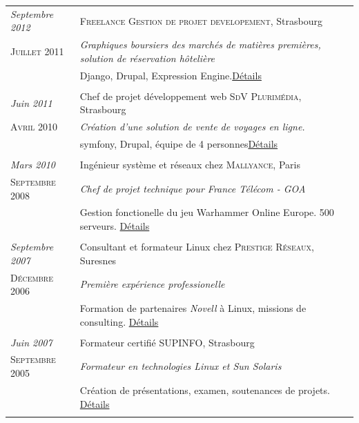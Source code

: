 \documentclass[a4paper,10pt]{article}
\begin{document}
\begin{tabular}{p{}|p{}}
	\emph{Septembre 2012} & \textsc{Freelance Gestion de projet developement}, Strasbourg \\\textsc{Juillet 2011}&\emph{Graphiques boursiers des marchés de matières premières, solution de réservation hôtelière}\\&\footnotesize{Django, Drupal, Expression Engine.\hyperlink{freelance}{\hfill \footnotesize Détails}}\\\multicolumn{2}{c}{} \\

\emph{Juin 2011} & Chef de projet développement web \textsc{SdV Plurimédia}, Strasbourg \\\textsc{Avril 2010}&\emph{Création d'une solution de vente de voyages en ligne.}\\&\footnotesize{symfony, Drupal, équipe de 4 personnes\hyperlink{sdv}{\hfill \footnotesize Détails}}\\\multicolumn{2}{c}{} \\
  
 \emph{Mars 2010} & Ingénieur système et réseaux chez \textsc{Mallyance}, Paris \\\textsc{Septembre 2008}&\emph{Chef de projet technique pour France Télécom - GOA}\\&\footnotesize{Gestion fonctionelle du jeu Warhammer Online Europe. 500 serveurs. \hyperlink{mallyance}{\hfill \footnotesize Détails}}\\\multicolumn{2}{c}{} \\

 \emph{Septembre 2007} & Consultant et formateur Linux chez \textsc{Prestige Réseaux}, Suresnes \\\textsc{Décembre 2006}&\emph{Première expérience professionelle}\\&\footnotesize{Formation de partenaires \emph{Novell} à Linux, missions de consulting. \hyperlink{prestige}{\hfill \footnotesize Détails}}\\\multicolumn{2}{c}{} \\

 \emph{Juin 2007} & Formateur certifié \textsc{SUPINFO}, Strasbourg \\\textsc{Septembre 2005}&\emph{Formateur en technologies Linux et Sun Solaris}\\&\footnotesize{Création de présentations, examen, soutenances de projets. \hyperlink{supinfo}{\hfill \footnotesize Détails}}\\\multicolumn{2}{c}{}
\end{tabular}
\end{document}
